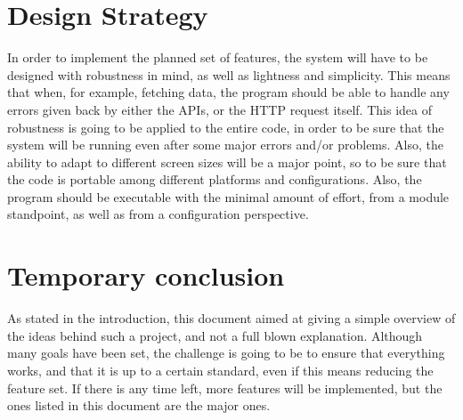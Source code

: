 \documentclass[a4paper]{article}
\begin{document}
\section{Design Strategy}
In order to implement the planned set of features, the system will have to be designed with robustness in mind, as well as lightness and simplicity. This means that when, for example, fetching data, the program should be able to handle any errors given back by either the APIs, or the HTTP request itself. This idea of robustness is going to be applied to the entire code, in order to be sure that the system will be running even after some major errors and/or problems. Also, the ability to adapt to different screen sizes will be a major point, so to be sure that the code is portable among different platforms and configurations. Also, the program should be executable with the minimal amount of effort, from a module standpoint, as well as from a configuration perspective. 

\section{Temporary conclusion}
As stated in the introduction, this document aimed at giving a simple overview of the ideas behind such a project, and not a full blown explanation. Although many goals have been set, the challenge is going to be to ensure that everything works, and that it is up to a certain standard, even if this means reducing the feature set. If there is any time left, more features will be implemented, but the ones listed in this document are the major ones. 
\end{document}
